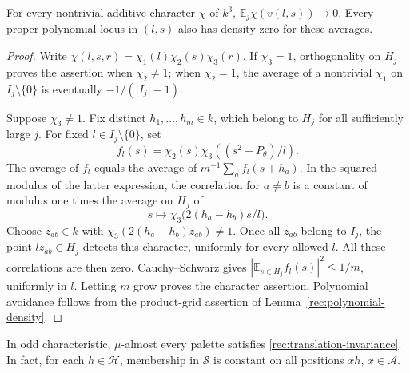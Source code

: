\begin{lemma}\label{rec:quadric-orthogonality}
For every nontrivial additive character \(\chi\) of \(k^3\),
\(\mathbb E_j\chi(v(l,s))\to0\).  Every proper polynomial locus in
\((l,s)\) also has density zero for these averages.
\end{lemma}

\begin{proof}
Write \(\chi(l,s,r)=\chi_1(l)\chi_2(s)\chi_3(r)\).  If
\(\chi_3=1\), orthogonality on \(H_j\) proves the assertion when
\(\chi_2\ne1\); when \(\chi_2=1\), the average of a nontrivial
\(\chi_1\) on \(I_j\setminus\{0\}\) is eventually
\(-1/(|I_j|-1)\).

Suppose \(\chi_3\ne1\).  Fix distinct \(h_1,\ldots,h_m\in k\),
which belong to \(H_j\) for all sufficiently large \(j\).  For fixed
\(l\in I_j\setminus\{0\}\), set
\[
 f_l(s)=\chi_2(s)\chi_3((s^2+P_\theta)/l).
\]
The average of \(f_l\) equals the average of
\(m^{-1}\sum_a f_l(s+h_a)\).  In the squared modulus of the latter expression,
the correlation for \(a\ne b\) is a constant of modulus one times
the average on \(H_j\) of
\[
 s\longmapsto\chi_3\bigl(2(h_a-h_b)s/l\bigr).
\]
Choose \(z_{ab}\in k\) with
\(\chi_3(2(h_a-h_b)z_{ab})\ne1\).  Once all \(z_{ab}\) belong to
\(I_j\), the point \(lz_{ab}\in H_j\) detects this character,
uniformly for every allowed \(l\).  All these correlations are then
zero.  Cauchy--Schwarz gives
\( |\mathbb E_{s\in H_j}f_l(s)|^2\leq1/m\), uniformly in \(l\).
Letting \(m\) grow proves the character assertion.  Polynomial
avoidance follows from the product-grid assertion of
Lemma~\ref{rec:polynomial-density}.
\end{proof}

\begin{proposition}\label{rec:odd}
In odd characteristic, \(\mu\)-almost every palette satisfies
\eqref{rec:translation-invariance}.  In fact, for each
\(h\in\mathcal H\), membership in \(\mathcal S\) is constant on all
positions \(xh\), \(x\in\mathcal A\).
\end{proposition}

